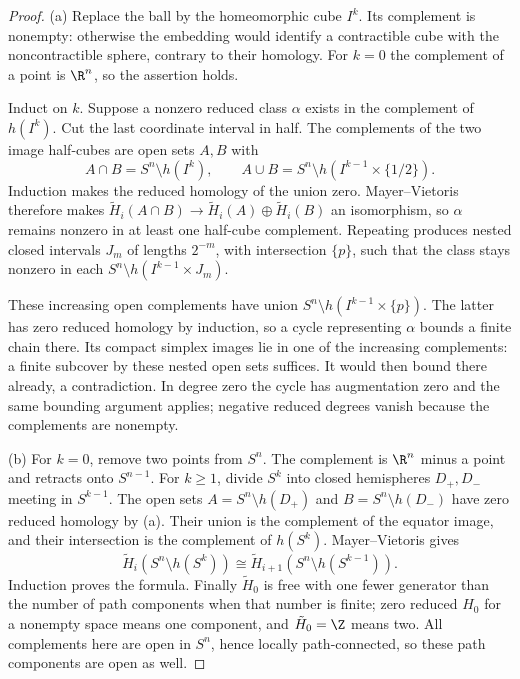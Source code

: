 \begin{proof}
(a) Replace the ball by the homeomorphic cube $I^k$. Its complement is nonempty: otherwise the embedding would identify a contractible cube with the noncontractible sphere, contrary to their homology. For $k=0$ the complement of a point is $\R^n$, so the assertion holds.

Induct on $k$. Suppose a nonzero reduced class $\alpha$ exists in the complement of $h(I^k)$. Cut the last coordinate interval in half. The complements of the two image half-cubes are open sets $A,B$ with
\[
A\cap B=S^n\setminus h(I^k),\qquad
A\cup B=S^n\setminus h(I^{k-1}\times\{1/2\}).
\]
Induction makes the reduced homology of the union zero. Mayer--Vietoris therefore makes $\tilde H_i(A\cap B)\to\tilde H_i(A)\oplus\tilde H_i(B)$ an isomorphism, so $\alpha$ remains nonzero in at least one half-cube complement. Repeating produces nested closed intervals $J_m$ of lengths $2^{-m}$, with intersection $\{p\}$, such that the class stays nonzero in each $S^n\setminus h(I^{k-1}\times J_m)$.

These increasing open complements have union $S^n\setminus h(I^{k-1}\times\{p\})$. The latter has zero reduced homology by induction, so a cycle representing $\alpha$ bounds a finite chain there. Its compact simplex images lie in one of the increasing complements: a finite subcover by these nested open sets suffices. It would then bound there already, a contradiction. In degree zero the cycle has augmentation zero and the same bounding argument applies; negative reduced degrees vanish because the complements are nonempty.

(b) For $k=0$, remove two points from $S^n$. The complement is $\R^n$ minus a point and retracts onto $S^{n-1}$. For $k\ge1$, divide $S^k$ into closed hemispheres $D_+,D_-$ meeting in $S^{k-1}$. The open sets $A=S^n\setminus h(D_+)$ and $B=S^n\setminus h(D_-)$ have zero reduced homology by (a). Their union is the complement of the equator image, and their intersection is the complement of $h(S^k)$. Mayer--Vietoris gives
\[
\tilde H_i(S^n\setminus h(S^k))
\cong\tilde H_{i+1}(S^n\setminus h(S^{k-1})).
\]
Induction proves the formula. Finally $\tilde H_0$ is free with one fewer generator than the number of path components when that number is finite; zero reduced $H_0$ for a nonempty space means one component, and $\tilde H_0=\Z$ means two. All complements here are open in $S^n$, hence locally path-connected, so these path components are open as well.
\end{proof}

